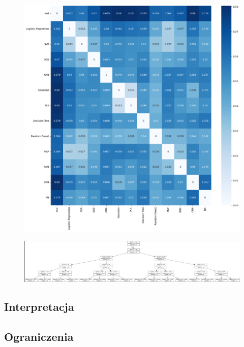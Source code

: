 \begin{figure}[H]
    \centering
    \includegraphics[width=\textwidth]{images/mae_matrix.png}
    \caption{}
    \label{mae-matrix}
\end{figure}


\begin{figure}[H]
    \centering
    \includegraphics[width=\textwidth]{images/tree.png}
    \caption{}
    \label{tree-graph}
\end{figure}

\subsection{Interpretacja}

\subsection{Ograniczenia}